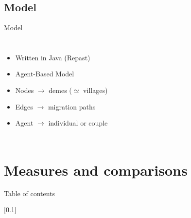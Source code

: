 \documentclass[10pt, aspectratio=43]{beamer}
\begin{document}
\subsection{Model}
\begin{frame}{}{Model}
\begin{columns}

  \begin{itemize}
    \item Written in Java (Repast)
    \item Agent-Based Model
    \item Nodes $\rightarrow$ demes ($\simeq$ villages)
    \item Edges $\rightarrow$ migration paths
    \item Agent $\rightarrow$ individual or couple
  \end{itemize}

\end{columns}
\end{frame}


\section{Measures and comparisons}
\begin{frame}{}{Table of contents}
\tableofcontents[currentsection, subsectionstyle=show/show/hide]
\end{frame}

[0.1]{}{}{}
\end{document}
